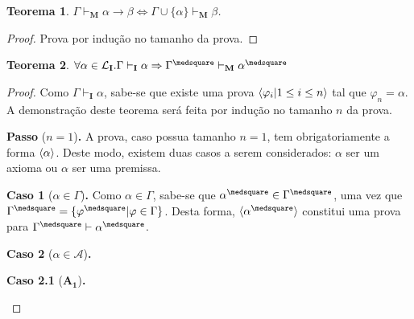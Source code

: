 \documentclass{report}
\newtheorem{theorem}{Teorema}
\begin{document}
    \begin{theorem}
        $\Gamma\vdash_\mathbf{M}\alpha\to\beta\Leftrightarrow\Gamma\cup\{\alpha\}\vdash_\mathbf{M}\beta$.
    \end{theorem}

    \begin{proof}
        Prova por indução no tamanho da prova.
    \end{proof}

    \begin{theorem}
        $\forall \alpha \in \mathcal{L}_\mathbf{I} . \Gamma \vdash_\mathbf{I} \alpha \Rightarrow \Gamma^\medsquare \vdash_\mathbf{M} \alpha^\medsquare$
    \end{theorem}

    \begin{proof}
        Como $\Gamma \vdash_\mathbf{I} \alpha$, sabe-se que existe uma prova $\langle\varphi_i | 1 \leq i \leq n\rangle$ tal que $\varphi_n = \alpha$. A demonstração deste teorema será feita por indução no tamanho $n$ da prova.

        \begin{case}
                \textbf{Passo} ($n = 1$)\textbf{.} A prova, caso possua tamanho $n = 1$, tem obrigatoriamente a forma $\langle\alpha\rangle$. Deste modo, existem duas casos a serem considerados: $\alpha$ ser um axioma ou $\alpha$ ser uma premissa.
                
                \begin{case}
                    \textbf{Caso 1} ($\alpha\in\Gamma$)\textbf{.} Como $\alpha\in\Gamma$, sabe-se que $\alpha^\medsquare\in\Gamma^\medsquare$, uma vez que $\Gamma^\medsquare = \set{\varphi^\medsquare | \varphi\in\Gamma}$. Desta forma, $\sequence{\alpha^\medsquare}$ constitui uma prova para $\Gamma^\medsquare\vdash\alpha^\medsquare$.
                \end{case}

                \begin{case}
                    \textbf{Caso 2} ($\alpha\in\mathcal{A}$)\textbf{.}

                    \begin{case}
                        \textbf{Caso 2.1} ($\mathbf{A_1}$)\textbf{.}


\end{case}
\end{case}
\end{case}
\end{proof}
\end{document}
